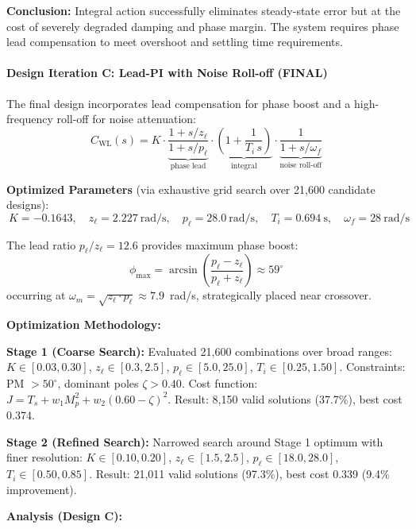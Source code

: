 \textbf{Conclusion:} Integral action successfully eliminates steady-state error but at the cost of severely degraded damping and phase margin. The system requires phase lead compensation to meet overshoot and settling time requirements.

\paragraph{Design Iteration C: Lead-PI with Noise Roll-off (FINAL)}

The final design incorporates lead compensation for phase boost and a high-frequency roll-off for noise attenuation:
\begin{equation}
C_{\mathrm{WL}}(s) = K \cdot \underbrace{\frac{1 + s/z_\ell}{1 + s/p_\ell}}_{\text{phase lead}} \cdot \underbrace{\left(1 + \frac{1}{T_i\,s}\right)}_{\text{integral}} \cdot \underbrace{\frac{1}{1 + s/\omega_f}}_{\text{noise roll-off}}
\label{eq:design_C}
\end{equation}

\textbf{Optimized Parameters} (via exhaustive grid search over 21,600 candidate designs):
\begin{equation}
\boxed{~
K = -0.1643,\quad
z_\ell = 2.227~\text{rad/s},\quad
p_\ell = 28.0~\text{rad/s},\quad
T_i = 0.694~\text{s},\quad
\omega_f = 28~\text{rad/s}
~}
\label{eq:final_params}
\end{equation}

The lead ratio $p_\ell/z_\ell = 12.6$ provides maximum phase boost:
\[
\phi_{\max} = \arcsin\left(\frac{p_\ell - z_\ell}{p_\ell + z_\ell}\right) \approx 59^\circ
\]
occurring at $\omega_m = \sqrt{z_\ell \cdot p_\ell} \approx 7.9$~rad/s, strategically placed near crossover.

\textbf{Optimization Methodology:}

\textbf{Stage 1 (Coarse Search):} Evaluated 21,600 combinations over broad ranges: $K \in [0.03,0.30]$, $z_\ell \in [0.3,2.5]$, $p_\ell \in [5.0,25.0]$, $T_i \in [0.25,1.50]$. Constraints: PM $>50^\circ$, dominant poles $\zeta > 0.40$. Cost function: $J = T_s + w_1 M_p^2 + w_2(0.60-\zeta)^2$. Result: 8,150 valid solutions (37.7\%), best cost 0.374.

\textbf{Stage 2 (Refined Search):} Narrowed search around Stage 1 optimum with finer resolution: $K \in [0.10,0.20]$, $z_\ell \in [1.5,2.5]$, $p_\ell \in [18.0,28.0]$, $T_i \in [0.50,0.85]$. Result: 21,011 valid solutions (97.3\%), best cost 0.339 (9.4\% improvement).

\textbf{Analysis (Design C):}

